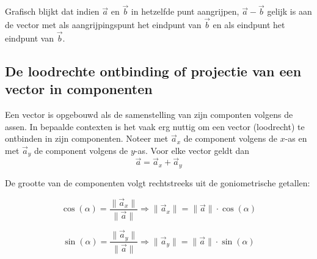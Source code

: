 \documentclass{ximera}
\begin{document}
Grafisch blijkt dat indien \(\vec{a}\) en \(\vec{b}\) in hetzelfde punt aangrijpen, \(\vec{a} - \vec{b}\) gelijk is aan de vector met als aangrijpingspunt het eindpunt van \(\vec{b}\) en als eindpunt het eindpunt van \(\vec{b}\).



\subsection*{De loodrechte ontbinding of projectie van een vector in componenten}



Een vector is opgebouwd als de samenstelling van zijn componten volgens de assen.  
In bepaalde contexten is het vaak erg nuttig om een vector (loodrecht) te ontbinden in zijn componenten. 
Noteer met \(\vec{a}_x\) de component volgens de \(x\)-as en met \(\vec{a}_y\) de component volgens de \(y\)-as. 
Voor elke vector geldt dan 
\[
\vec{a} = \vec{a}_x + \vec{a}_y
\]

De grootte van de componenten volgt rechtstreeks uit de goniometrische getallen: 

\[
\cos(\alpha) = \frac{\| \vec{a}_x \|}{\| \vec{a} \|} \Rightarrow \| \vec{a}_x \| = \|\vec{a}\| \cdot \cos(\alpha)
\]

\[
\sin(\alpha) = \frac{\| \vec{a}_y \|}{\| \vec{a} \|} \Rightarrow \| \vec{a}_y \| = \|\vec{a}\| \cdot \sin(\alpha)
\]

\begin{image}[!]
\end{image}
\end{document}
